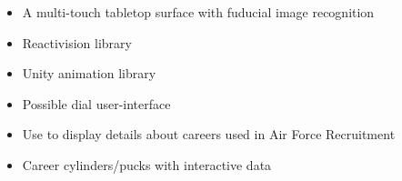 \begin{itemize}
  \item A multi-touch tabletop surface with fuducial image recognition
  \item Reactivision library
  \item Unity animation library
  \item Possible dial user-interface
  \item Use to display details about careers used in Air Force Recruitment
  \item Career cylinders/pucks with interactive data
\end{itemize}
